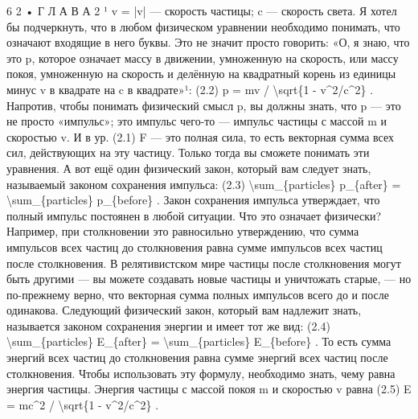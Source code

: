 \documentclass[10pt,oneside]{article}
\begin{document}
6 2 • Г Л А В А  2 ¹ v = |v| --- скорость частицы; c --- скорость света. Я хотел бы подчеркнуть, что в любом физическом уравнении необходимо понимать, что означают входящие в него буквы. Это не значит просто говорить: «О, я знаю, что это p, которое означает массу в движении, умноженную на скорость, или массу покоя, умноженную на скорость и делённую на квадратный корень из единицы минус v в квадрате на c в квадрате»¹: (2.2) p = mv / \textbackslash{}sqrt\{1 - v\textasciicircum{}2/c\textasciicircum{}2\} . Напротив, чтобы понимать физический смысл p, вы должны знать, что p --- это не просто «импульс»; это импульс чего-то --- импульс частицы с массой m и скоростью v. И в ур. (2.1) F --- это полная сила, то есть векторная сумма всех сил, действующих на эту частицу. Только тогда вы сможете понимать эти уравнения. А вот ещё один физический закон, который вам следует знать, называемый законом сохранения импульса: (2.3) \textbackslash{}sum\_\{particles\} p\_\{after\} = \textbackslash{}sum\_\{particles\} p\_\{before\} . Закон сохранения импульса утверждает, что полный импульс постоянен в любой ситуации. Что это означает физически? Например, при столкновении это равносильно утверждению, что сумма импульсов всех частиц до столкновения равна сумме импульсов всех частиц после столкновения. В релятивистском мире частицы после столкновения могут быть другими --- вы можете создавать новые частицы и уничтожать старые, --- но по-прежнему верно, что векторная сумма полных импульсов всего до и после одинакова. Следующий физический закон, который вам надлежит знать, называется законом сохранения энергии и имеет тот же вид: (2.4) \textbackslash{}sum\_\{particles\} E\_\{after\} = \textbackslash{}sum\_\{particles\} E\_\{before\} . То есть сумма энергий всех частиц до столкновения равна сумме энергий всех частиц после столкновения. Чтобы использовать эту формулу, необходимо знать, чему равна энергия частицы. Энергия частицы с массой покоя m и скоростью v равна (2.5) E = mc\textasciicircum{}2 / \textbackslash{}sqrt\{1 - v\textasciicircum{}2/c\textasciicircum{}2\} .\par
\end{document}
